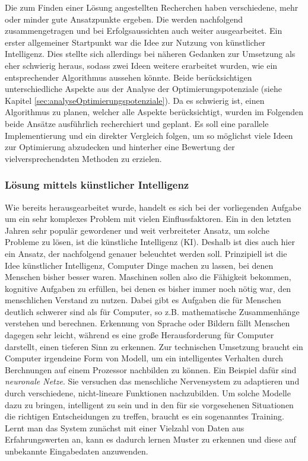 Die zum Finden einer Lösung angestellten Recherchen haben verschiedene, mehr oder minder gute Ansatzpunkte ergeben. Die werden nachfolgend zusammengetragen und bei Erfolgsaussichten auch weiter ausgearbeitet. Ein erster allgemeiner Startpunkt war die Idee zur Nutzung von künstlicher Intelligenz. Dies stellte sich allerdings bei näheren Gedanken zur Umsetzung als eher schwierig heraus, sodass zwei Ideen weitere erarbeitet wurden, wie ein entsprechender Algorithmus aussehen könnte. Beide berücksichtigen unterschiedliche Aspekte aus der Analyse der Optimierungspotenziale (siehe Kapitel \ref{sec:analyseOptimierungspotenziale}). Da es schwierig ist, einen Algorithmus zu planen, welcher alle Aspekte berücksichtigt, wurden im Folgenden beide Ansätze ausführlich recherchiert und geplant. Es soll eine parallele Implementierung und ein direkter Vergleich folgen, um so möglichst viele Ideen zur Optimierung abzudecken und hinterher eine Bewertung der vielversprechendsten Methoden zu erzielen.

\subsubsection{Lösung mittels künstlicher Intelligenz}

Wie bereits herausgearbeitet wurde, handelt es sich bei der vorliegenden Aufgabe um ein sehr komplexes Problem mit vielen Einflussfaktoren. Ein in den letzten Jahren sehr populär gewordener und weit verbreiteter Ansatz, um solche Probleme zu lösen, ist die künstliche Intelligenz (KI). Deshalb ist dies auch hier ein Ansatz, der nachfolgend genauer beleuchtet werden soll. Prinzipiell ist die Idee künstlicher Intelligenz, Computer Dinge machen zu lassen, bei denen Menschen bisher besser waren. Maschinen sollen also die Fähigkeit bekommen, kognitive Aufgaben zu erfüllen, bei denen es bisher immer noch nötig war, den menschlichen Verstand zu nutzen. Dabei gibt es Aufgaben die für Menschen deutlich schwerer sind als für Computer, so z.B. mathematische Zusammenhänge verstehen und berechnen. Erkennung von Sprache oder Bildern fällt Menschen dagegen sehr leicht, während es eine große Herausforderung für Computer darstellt, einen tieferen Sinn zu erkennen. Zur technischen Umsetzung braucht ein Computer irgendeine Form von Modell, um ein \glqq{}intelligentes\grqq{} Verhalten durch Berchnungen auf einem Prozessor nachbilden zu können. Ein Beispiel dafür sind \textit{neuronale Netze}. Sie versuchen das menschliche Nervensystem zu adaptieren und durch verschiedene, nicht-lineare Funktionen nachzubilden. Um solche Modelle dazu zu bringen, \glqq{}intelligent\grqq{} zu sein und in den für sie vorgesehenen Situationen die richtigen Entscheidungen zu treffen, braucht es ein sogenanntes Training. Lernt man das System zunächst mit einer Vielzahl von Daten aus Erfahrungswerten an, kann es dadurch lernen Muster zu erkennen und diese auf unbekannte Eingabedaten anzuwenden. \cite{KIverstehen}

